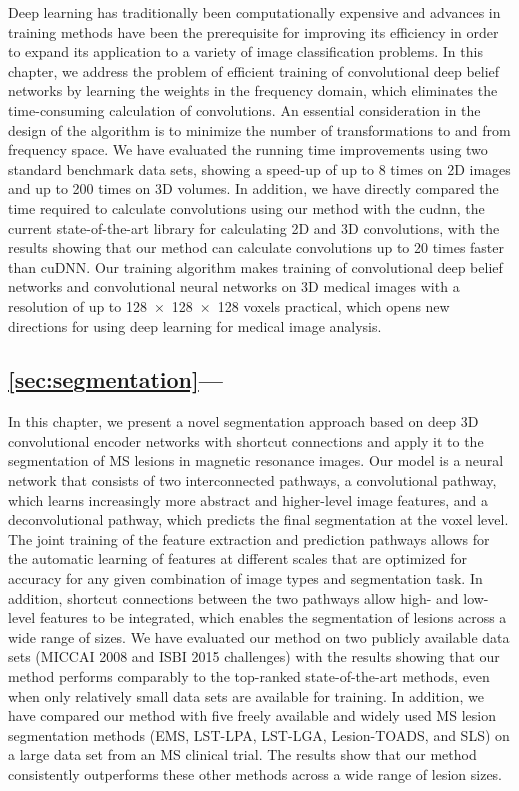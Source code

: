 Deep learning has traditionally been computationally expensive and advances in
training methods have been the prerequisite for improving its efficiency in
order to expand its application to a variety of image classification problems.
In this chapter, we address the problem of efficient training of convolutional
deep belief networks by learning the weights in the frequency domain, which
eliminates the time-consuming calculation of convolutions. An essential
consideration in the design of the algorithm is to minimize the number of
transformations to and from frequency space. We have evaluated the running time
improvements using two standard benchmark data sets, showing a speed-up of up to
8 times on 2D images and up to 200 times on 3D volumes. In addition, we have
directly compared the time required to calculate convolutions using our method
with the \gls{cudnn}, the current state-of-the-art library for calculating 2D
and 3D convolutions, with the results showing that our method can calculate
convolutions up to 20 times faster than cuDNN. Our training algorithm makes
training of convolutional deep belief networks and convolutional neural networks
on 3D medical images with a resolution of up to \num{128x128x128} voxels
practical, which opens new directions for using deep learning for medical image
analysis.

\subsection*{\ref{sec:segmentation}---}

In this chapter, we present a novel segmentation approach based on deep 3D
convolutional encoder networks with shortcut connections and apply it to the
segmentation of MS lesions in magnetic resonance images. Our model is a neural
network that consists of two interconnected pathways, a convolutional pathway,
which learns increasingly more abstract and higher-level image features, and a
deconvolutional pathway, which predicts the final segmentation at the voxel
level. The joint training of the feature extraction and prediction pathways
allows for the automatic learning of features at different scales that are
optimized for accuracy for any given combination of image types and segmentation
task. In addition, shortcut connections between the two pathways allow high- and
low-level features to be integrated, which enables the segmentation of lesions
across a wide range of sizes. We have evaluated our method on two publicly
available data sets (MICCAI 2008 and ISBI 2015 challenges) with the results
showing that our method performs comparably to the top-ranked state-of-the-art
methods, even when only relatively small data sets are available for training.
In addition, we have compared our method with five freely available and widely
used MS lesion segmentation methods (EMS, LST-LPA, LST-LGA, Lesion-TOADS, and
SLS) on a large data set from an MS clinical trial.
The results show that our method consistently outperforms these other methods
across a wide range of lesion sizes.

